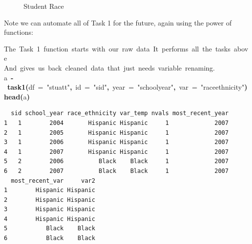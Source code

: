 \documentclass[12pt]{article}
\makeatletter
\newcommand{\hlfunctioncall}[1]{\textcolor[rgb]{0.501960784313725,0,0.329411764705882}{\textbf{#1}}}%
\newcommand{\hlstring}[1]{\textcolor[rgb]{0.6,0.6,1}{#1}}%
\newcommand{\hlkeyword}[1]{\textcolor[rgb]{0,0,0}{\textbf{#1}}}%
\newcommand{\hlargument}[1]{\textcolor[rgb]{0.690196078431373,0.250980392156863,0.0196078431372549}{#1}}%
\newcommand{\hlcomment}[1]{\textcolor[rgb]{0.180392156862745,0.6,0.341176470588235}{#1}}%
\newcommand{\hlassignement}[1]{\textcolor[rgb]{0,0,0}{\textbf{#1}}}%
\newcommand{\hlsymbol}[1]{\textcolor[rgb]{0,0,0}{#1}}%
\newcommand{\hlstd}[1]{\textcolor[rgb]{0,0,0}{#1}}%
\newenvironment{kframe}{%
 \def\FrameCommand##1{\hskip\@totalleftmargin \hskip-\fboxsep
 \colorbox{shadecolor}{##1}\hskip-\fboxsep
     \hskip-\linewidth \hskip-\@totalleftmargin \hskip\columnwidth}%
 \MakeFramed {\advance\hsize-\width
   \@totalleftmargin\z@ \linewidth\hsize
   \@setminipage}}%
 {\par\unskip\endMakeFramed}
\newenvironment{knitrout}{}{} %
\renewenvironment{knitrout}{\begin{footnotesize}}{\end{footnotesize}}
\makeatother
\begin{document}
\begin{knitrout}
\begin{figure}[]
{}

\caption[Student Race]{Student Race\label{fig:histogramfinal}}
\end{figure}

\end{knitrout}


Note we can automate all of Task 1 for the future, again using the power of functions:
\begin{knitrout}
\color{fgcolor}\begin{kframe}
\begin{flushleft}
\ttfamily\noindent
\hlcomment{\usebox{\hlnormalsizeboxhash}{\ }The{\ }Task{\ }1{\ }function{\ }starts{\ }with{\ }our{\ }raw{\ }data{\ }It{\ }performs{\ }all{\ }the{\ }tasks{\ }above}\hspace*{\fill}\\
\hlstd{}\hlcomment{\usebox{\hlnormalsizeboxhash}{\ }And{\ }gives{\ }us{\ }back{\ }cleaned{\ }data{\ }that{\ }just{\ }needs{\ }variable{\ }renaming.}\hspace*{\fill}\\
\hlstd{}\hlsymbol{a}{\ }\hlassignement{\usebox{\hlnormalsizeboxlessthan}-}{\ }\hlfunctioncall{task1}\hlkeyword{(}\hlargument{df}{\ }\hlargument{=}{\ }\hlstring{"{}stuatt"{}}\hlkeyword{,}{\ }\hlargument{id}{\ }\hlargument{=}{\ }\hlstring{"{}sid"{}}\hlkeyword{,}{\ }\hlargument{year}{\ }\hlargument{=}{\ }\hlstring{"{}school\usebox{\hlnormalsizeboxunderscore}year"{}}\hlkeyword{,}{\ }\hlargument{var}{\ }\hlargument{=}{\ }\hlstring{"{}race\usebox{\hlnormalsizeboxunderscore}ethnicity"{}}\hlkeyword{)}\hspace*{\fill}\\
\hlstd{}\hlfunctioncall{head}\hlkeyword{(}\hlsymbol{a}\hlkeyword{)}\mbox{}
\normalfont
\end{flushleft}
\begin{verbatim}
  sid school_year race_ethnicity var_temp nvals most_recent_year
1   1        2004       Hispanic Hispanic     1             2007
2   1        2005       Hispanic Hispanic     1             2007
3   1        2006       Hispanic Hispanic     1             2007
4   1        2007       Hispanic Hispanic     1             2007
5   2        2006          Black    Black     1             2007
6   2        2007          Black    Black     1             2007
  most_recent_var     var2
1        Hispanic Hispanic
2        Hispanic Hispanic
3        Hispanic Hispanic
4        Hispanic Hispanic
5           Black    Black
6           Black    Black
\end{verbatim}
\end{kframe}
\end{knitrout}
\end{document}
